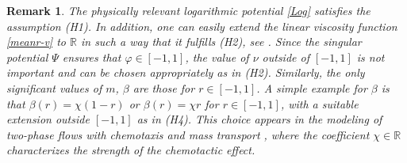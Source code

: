 \documentclass[11pt,reqno]{amsart}
\newtheorem{remark}{\textbf{Remark}}[section]
\begin{document}
\begin{remark}\rm
The physically relevant logarithmic potential \eqref{Log} satisfies the assumption (H1). In addition, one can easily extend the linear viscosity function \eqref{meanr-v} to $\mathbb{R}$ in such a way that it fulfills (H2), see \cite[Remark 2.1]{GMT2019}. Since the singular potential $\Psi$ ensures that $\varphi\in [-1,1]$, the value of $\nu$ outside of $[-1,1]$ is not important and can be chosen appropriately as in (H2). Similarly, the only significant values of $m$, $\beta$ are those for $r\in[-1,1]$. A simple example for $\beta$ is that $\beta(r)=\chi (1-r)$ or $\beta(r)=\chi r$ for $r\in[-1,1]$, with a suitable extension outside $[-1,1]$ as in (H4). This choice appears in the modeling of two-phase flows with chemotaxis and mass transport \cite{GLSS,LW2018}, where the coefficient $\chi\in \mathbb{R}$ characterizes the strength of the chemotactic effect.
\end{remark}
\end{document}
